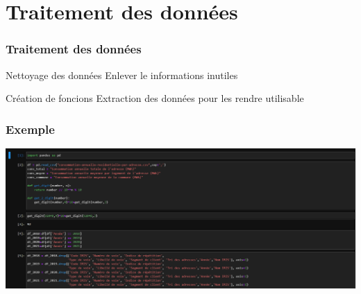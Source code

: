 
\section{Traitement des données}

\begin{frame}
\frametitle{Traitement des données}


\begin{block}{Nettoyage des données}
Enlever le informations inutiles
\end{block}

\begin{block}{Création de foncions}
Extraction des données pour les rendre utilisable
\end{block}


\end{frame}


\begin{frame}
\frametitle{Exemple}
\includegraphics[scale=0.30]{images/Imagedonnee.png}

\end{frame}